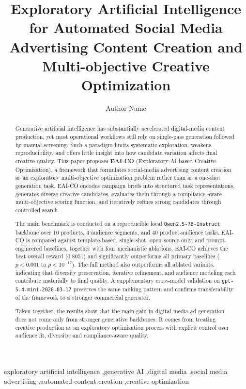 \documentclass[preprint,12pt]{elsarticle}
\begin{document}
\begin{frontmatter}

\title{Exploratory Artificial Intelligence for Automated Social Media Advertising Content Creation and Multi-objective Creative Optimization}

\author{Author Name}
\address{Affiliation}

\begin{abstract}
Generative artificial intelligence has substantially accelerated digital-media content production, yet most operational workflows still rely on single-pass generation followed by manual screening. Such a paradigm limits systematic exploration, weakens reproducibility, and offers little insight into how candidate variation affects final creative quality. This paper proposes \textbf{EAI-CO} (Exploratory AI-based Creative Optimization), a framework that formulates social-media advertising content creation as an exploratory multi-objective optimization problem rather than as a one-shot generation task. EAI-CO encodes campaign briefs into structured task representations, generates diverse creative candidates, evaluates them through a compliance-aware multi-objective scoring function, and iteratively refines strong candidates through controlled search.

The main benchmark is conducted on a reproducible local \texttt{Qwen2.5-7B-Instruct} backbone over 10 products, 4 audience segments, and 40 product-audience tasks. EAI-CO is compared against template-based, single-shot, open-source-only, and prompt-engineered baselines, together with four mechanistic ablations. EAI-CO achieves the best overall reward (0.8051) and significantly outperforms all primary baselines ($p < 0.001$ to $p < 10^{-12}$). The full method also outperforms all ablated variants, indicating that diversity preservation, iterative refinement, and audience modeling each contribute materially to final quality. A supplementary cross-model validation on \texttt{gpt-5.4-mini-2026-03-17} preserves the same ranking pattern and confirms transferability of the framework to a stronger commercial generator.

Taken together, the results show that the main gain in digital-media ad generation does not come only from stronger generative backbones. It comes from treating creative production as an exploratory optimization process with explicit control over audience fit, diversity, and compliance-aware quality.
\end{abstract}

\begin{keyword}
exploratory artificial intelligence \sep generative AI \sep digital media \sep social media advertising \sep automated content creation \sep creative optimization
\end{keyword}

\end{frontmatter}
\end{document}
